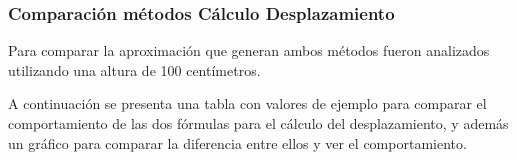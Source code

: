 \documentclass[12pt,a4paper]{article}
\begin{document}
\subsubsection{Comparación métodos Cálculo Desplazamiento}
Para comparar la aproximación que generan ambos métodos fueron analizados utilizando una altura de 100 centímetros.

A continuación se presenta una tabla con valores de ejemplo para comparar el comportamiento de las dos fórmulas para el cálculo del desplazamiento, y además un gráfico para comparar la diferencia entre ellos y ver el comportamiento.

\begin{figure}[H]
	\begin{subfigure}{.5\textwidth}
		

\end{subfigure}
\end{figure}
\end{document}
